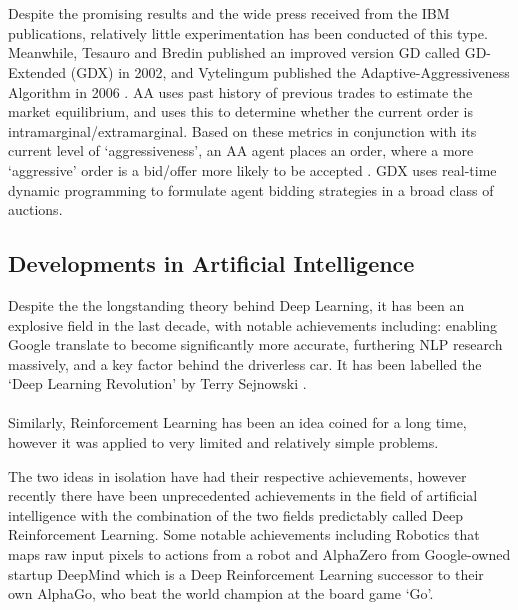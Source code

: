 \documentclass[ %
                    author={Ashwinder Khurana},
                supervisor={Prof Dave Cliff},
                    degree={MEng},
                     title={The Deeply Reinforced Trader},
                  subtitle={},
                      type={enterprise},
                      year={2020} ]{dissertation}
\begin{document}
\\
\\
Despite the promising results and the wide press received from the IBM publications, relatively little experimentation has been conducted of this type. Meanwhile, Tesauro and Bredin published an improved version GD called GD-Extended (GDX) in 2002, and Vytelingum published the Adaptive-Aggressiveness Algorithm in 2006 \cite{AA}. AA uses past history of previous trades to estimate the market equilibrium, and uses this to determine whether the current order is intramarginal/extramarginal. Based on these metrics in conjunction with its current level of \enquote*{aggressiveness}, an AA agent places an order, where a more \enquote*{aggressive} order is a bid/offer more likely to be accepted \cite{FinTech Lecture Slides}. GDX uses real-time dynamic programming to formulate agent bidding strategies in a broad class of auctions\cite{FinTech Lecture Slides}. 

\subsection{Developments in Artificial Intelligence}
\label{ section:DevelopmentsAI}
Despite the the longstanding theory behind Deep Learning, it has been an explosive field in the last decade, with notable achievements including: enabling Google translate to become significantly more accurate, furthering NLP research massively, and a key factor behind the driverless car. It has been labelled the \enquote*{Deep Learning Revolution} by Terry Sejnowski \cite{Deep Learning Revolution}.
\\
\\
Similarly, Reinforcement Learning has been an idea coined for a long time\cite{RL-history}, however it was applied to very limited and relatively simple problems. 

The two ideas in isolation have had their respective achievements, however recently there have been unprecedented achievements in the field of artificial intelligence with the combination of the two fields predictably called Deep Reinforcement Learning. Some notable achievements including Robotics \cite{deep learning robots https://arxiv.org/abs/1504.00702} that maps raw input pixels to actions from a robot and AlphaZero from Google-owned startup DeepMind which is a Deep Reinforcement Learning successor to their own AlphaGo, who beat the world champion at the board game \enquote*{Go}. 
\end{document}
